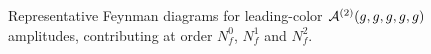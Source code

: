 \begin{figure}[ht]
  \begin{center}
\end{center} 
\caption{Representative Feynman diagrams for leading-color
$\mathcal{A}^{(2)}(g,g,g,g,g)$ amplitudes, contributing at order
$N_f^0$, $N_f^1$ and $N_f^2$.}
\label{fig_parents5g}
\end{figure}

